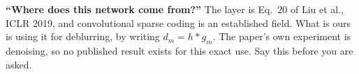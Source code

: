 \begin{defend}
\textbf{``Where does this network come from?''} The layer is Eq.~20 of Liu et al., ICLR 2019, and
convolutional sparse coding is an established field. What is ours is using it for deblurring, by
writing $d_m=h*g_m$. The paper's own experiment is denoising, so no published result exists for this exact
use. Say this before you are asked.
\end{defend}
